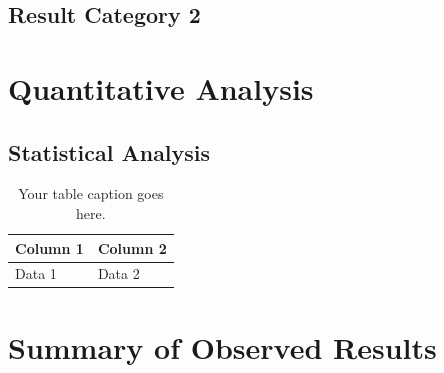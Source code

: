 

\subsection{Result Category 2}


\section{Quantitative Analysis}

\subsection{Statistical Analysis}


\begin{table}[htbp]
    \centering
    \begin{tabular}{ll}
    \toprule
    Column 1 & Column 2 \\
    \midrule
    Data 1 & Data 2 \\
    \bottomrule
    \end{tabular}
    \caption{Your table caption goes here.}
    \label{tab:example}
\end{table}

\section{Summary of Observed Results}



